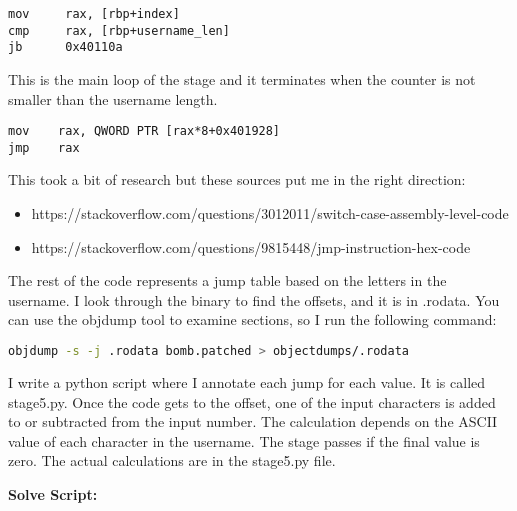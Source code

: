 \documentclass{article}
\begin{document}
\begin{lstlisting}
mov     rax, [rbp+index]
cmp     rax, [rbp+username_len]
jb      0x40110a
\end{lstlisting}
\par
This is the main loop of the stage and it terminates when the counter is 
not smaller than the username length.
\begin{lstlisting}
mov    rax, QWORD PTR [rax*8+0x401928]
jmp    rax
\end{lstlisting}
\par
This took a bit of research but these sources put me in the right direction:
\begin{itemize}
	\item https://stackoverflow.com/questions/3012011/switch-case-assembly-level-code
	\item https://stackoverflow.com/questions/9815448/jmp-instruction-hex-code
\end{itemize}
The rest of the code represents a jump table based on the letters in the 
username.  I look through the binary to find the offsets, and it is in 
.rodata.  You can use the objdump tool to examine sections, so I run the 
following command: 
\begin{lstlisting}[language=bash]
objdump -s -j .rodata bomb.patched > objectdumps/.rodata
\end{lstlisting}
I write a python script where I annotate each jump for each value.  It is 
called stage5.py.  Once the code gets to the offset, one of the input 
characters is added to or subtracted from the input number.  The calculation
depends on the ASCII value of each character in the username.  The stage 
passes if the final value is zero.  The actual calculations are in the 
stage5.py file.  

\begin{flushleft}
\textbf{Solve Script:}
\vspace{.5pc}
\end{flushleft}
\par
\end{document}
